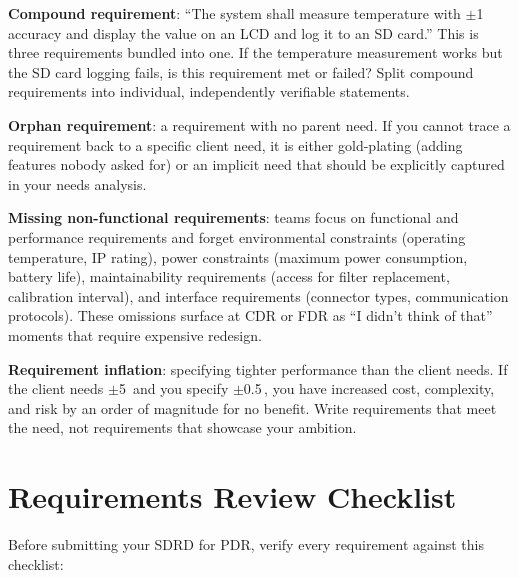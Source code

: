 \textbf{Compound requirement}: ``The system shall measure temperature with $\pm$1\,\degC{} accuracy and display the value on an LCD and log it to an SD card.'' This is three requirements bundled into one. If the temperature measurement works but the SD card logging fails, is this requirement met or failed? Split compound requirements into individual, independently verifiable statements.

\textbf{Orphan requirement}: a requirement with no parent need. If you cannot trace a requirement back to a specific client need, it is either gold-plating (adding features nobody asked for) or an implicit need that should be explicitly captured in your needs analysis.

\textbf{Missing non-functional requirements}: teams focus on functional and performance requirements and forget environmental constraints (operating temperature, IP rating), power constraints (maximum power consumption, battery life), maintainability requirements (access for filter replacement, calibration interval), and interface requirements (connector types, communication protocols). These omissions surface at CDR or FDR as ``I didn't think of that'' moments that require expensive redesign.

\textbf{Requirement inflation}: specifying tighter performance than the client needs. If the client needs $\pm$5\,\degC{} and you specify $\pm$0.5\,\degC{}, you have increased cost, complexity, and risk by an order of magnitude for no benefit. Write requirements that meet the need, not requirements that showcase your ambition.

\section{Requirements Review Checklist}
Before submitting your SDRD for PDR, verify every requirement against this checklist:

